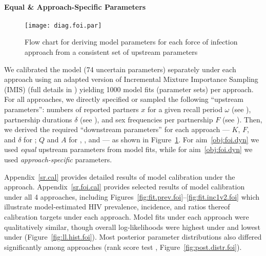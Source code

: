 \paragraph{Equal \& Approach-Specific Parameters}
\begin{figure}
  \centering\texttt{[image: diag.foi.par]}
  \caption{Flow chart for deriving model parameters for each force of infection approach
    from a consistent set of upstream parameters}
  \label{fig:diag.foi.par}
\end{figure}
We calibrated the model (74 uncertain parameters) separately under each approach
using an adapted version of Incremental Mixture Importance Sampling (IMIS) \cite{Raftery2010}
(full details in )
yielding 1000 model fits (parameter sets) per approach.
For all approaches, we directly specified or sampled the following ``upstream parameters'':
numbers of reported partners $x$ for a given recall period $\omega$ (see ),
partnership durations $\delta$ (see ), and
sex frequencies per partnership $F$ (see ).
Then, we derived the required ``downstream parameters'' for each approach
--- \ie $K$, $F$, and $\delta$ for \epa; $Q$ and $A$ for \ird, \iry, and \ipy ---
as shown in Figure~\ref{fig:diag.foi.par}.
For aim~\ref{obj:foi.dyn} we used \emph{equal} upstream parameters from \epa model fits,
while for aim~\ref{obj:foi.dyn} we used \emph{approach-specific} parameters.
\par
Appendix~\ref{sr.cal} provides detailed results of model calibration under the \epa approach.
Appendix~\ref{sr.foi.cal} provides selected results of model calibration under all 4 approaches,
including Figures~\ref{fig:fit.prev.foi}--\ref{fig:fit.inc1v2.foi} which illustrate
model-estimated HIV prevalence, incidence, and ratios thereof
\vs calibration targets under each approach.
Model fits under each approach were qualitatively similar,
though overall log-likelihoods were highest under \ipy and lowest under \iry
(Figure~\ref{fig:ll.hist.foi}).
Most posterior parameter distributions also differed significantly among approaches
(rank score test \cite{Kruskal1952}, Figure~\ref{fig:post.distr.foi}).
